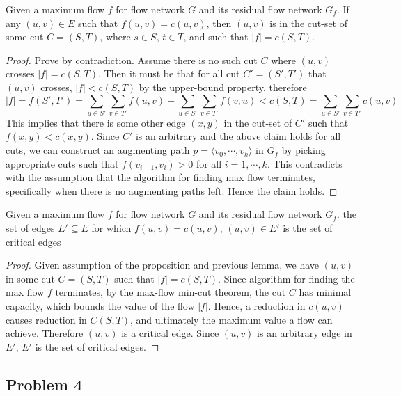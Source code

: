 \documentclass[11pt]{article}
\begin{document}
\begin{solution}
    \begin{lemma*}
        Given a maximum flow $f$ for flow network $G$ and its residual flow network $G_f$. If any $(u,v)\in E$ such that $f(u,v) = c(u,v)$, then $(u,v)$ is in the cut-set of some cut $C = (S,T)$, where $s\in S$, $t\in T$, and such that $|f| = c(S,T)$.
        \begin{proof}
            Prove by contradiction. Assume there is no such cut $C$ where $(u,v)$ crosses $|f| = c(S,T)$. Then it must be that for all cut $C' = (S', T')$ that $(u,v)$ crosses, $|f| < c(S,T)$ by the upper-bound property, therefore
            \[
                |f| = f(S', T') = \sum_{u\in S'} \sum_{v\in T'} f(u, v) - \sum_{u\in S'} \sum_{v\in T'} f(v, u)   < c(S,T) = \sum_{u\in S'} \sum_{v\in T'} c(u, v) 
            \]
            This implies that there is some other edge $(x,y)$ in the cut-set of $C'$ such that $f(x,y) < c(x,y)$. Since $C'$ is an arbitrary and the above claim holds for all cuts, we can construct an augmenting path $p = \langle v_0, \cdots, v_k \rangle$ in $G_f$ by picking appropriate cuts such that $f(v_{i-1}, v_i) > 0$ for all $i = 1,\cdots, k$. This contradicts with the assumption that the algorithm for finding max flow terminates, specifically when there is no augmenting paths left. Hence the claim holds.
        \end{proof}
    \end{lemma*}

    \begin{proposition*}
        Given a maximum flow $f$ for flow network $G$ and its residual flow network $G_f$. the set of edges $E' \subseteq E$ for which $f(u,v) = c(u,v)$, $(u,v) \in E'$ is the set of critical edges
        \begin{proof}
            Given assumption of the proposition and previous lemma, we have $(u,v)$ in some cut $C =(S,T)$ such that $|f| = c(S,T)$. Since algorithm for finding the max flow $f$ terminates, by the max-flow min-cut theorem, the cut $C$ has minimal capacity, which bounds the value of the flow $|f|$. Hence, a reduction in $c(u,v)$ causes reduction in $C(S,T)$, and ultimately the maximum value a flow can achieve. Therefore $(u,v)$ is a critical edge. Since $(u,v)$ is an arbitrary edge in $E'$, $E'$ is the set of critical edges. 
        \end{proof}
    \end{proposition*}

\end{solution}


\subsection*{Problem 4}
\end{document}
